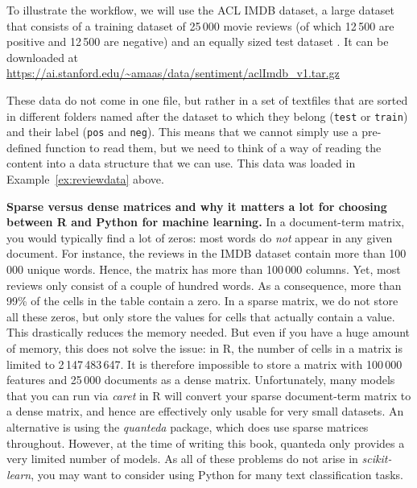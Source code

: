 To illustrate the workflow, we will use the ACL IMDB dataset, a large
dataset that consists  of a training dataset of 25\,000 movie
reviews (of which 12\,500 are positive  and 12\,500 are negative)
and an equally sized test dataset \citep{aclimdb}. It can be
downloaded at
\url{https://ai.stanford.edu/~amaas/data/sentiment/aclImdb_v1.tar.gz}


These data do not come in one file, but rather in a set of textfiles
that are sorted in different folders named after the dataset to which they
belong  (\verb|test| or \verb|train|) and their label (\verb|pos| and \verb|neg|). This
means that we cannot simply use a pre-defined function to read them,
but we need to think of a way of reading the content into a
data structure that we can use.
This data was loaded in Example~\ref{ex:reviewdata} above.

\label{feature:sparse}
\begin{feature}
  \textbf{Sparse versus dense matrices and why it matters a lot for
    choosing between R and Python for machine learning.} In a
  document-term matrix, you would typically find a lot of zeros: most
  words do \emph{not} appear in any given document. For instance, the
  reviews in the IMDB dataset contain more than 100\,000 unique
  words. Hence, the matrix has more than 100\,000 columns. Yet, most
  reviews only consist of a couple of hundred words. As a
  consequence, more than 99\% of the cells in the table contain a
  zero. In a sparse matrix, we do not store all these zeros, but only
  store the values for cells that actually contain a value. This
  drastically reduces the memory needed.  But even if you have a huge
  amount of memory, this does not solve the issue: in R, the number of
  cells in a matrix is limited to 2\,147\,483\,647. It is therefore
  impossible to store a matrix with 100\,000 features and 25\,000
  documents as a dense matrix. Unfortunately, many models that you can
  run via \emph{caret} in R will convert your sparse document-term
  matrix to a dense matrix, and hence are effectively only usable for
  very small datasets. An alternative is using the \emph{quanteda} package,
  which does use sparse matrices throughout. However, at the time of
  writing this book, quanteda only provides a very limited number of
  models. As all of these problems do not arise in \emph{scikit-learn},
  you may want to consider using Python for many text classification tasks.
\end{feature}



